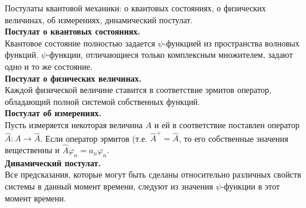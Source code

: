 \documentclass[__main__.tex]{subfiles}
\begin{document}
Постулаты квантовой механики: о квантовых состояниях, о физических величинах, об измерениях, динамический постулат.\\ 

\textbf{Постулат о квантовых состояниях.}\\
Квантовое состояние полностью задается $\psi$-функцией из пространства волновых функций. $\psi$-функции, отличающиеся только комплексным множителем, задают одно и то же состояние.\\

\textbf{Постулат о физических величинах.}\\
Каждой физической величине ставится в соответствие эрмитов оператор, обладающий полной системой собственных функций.\\

\textbf{Постулат об измерениях.}\\
Пусть измеряется некоторая величина $A$ и ей в соответствие поставлен оператор $\hat{A}: A \rightarrow \hat{A}$. Если оператор эрмитов (т.е. $\hat{A}^{+}=\hat{A}$, то его собственные значения вещественны и $\hat{A}\varphi_n=a_n\varphi_n$.\\

\textbf{Динамический постулат.}\\
Все предсказания, которые могут быть сделаны относительно различных свойств системы в данный момент времени, следуют из значения $\psi$-функции в этот момент времени.\\

\end{document}

